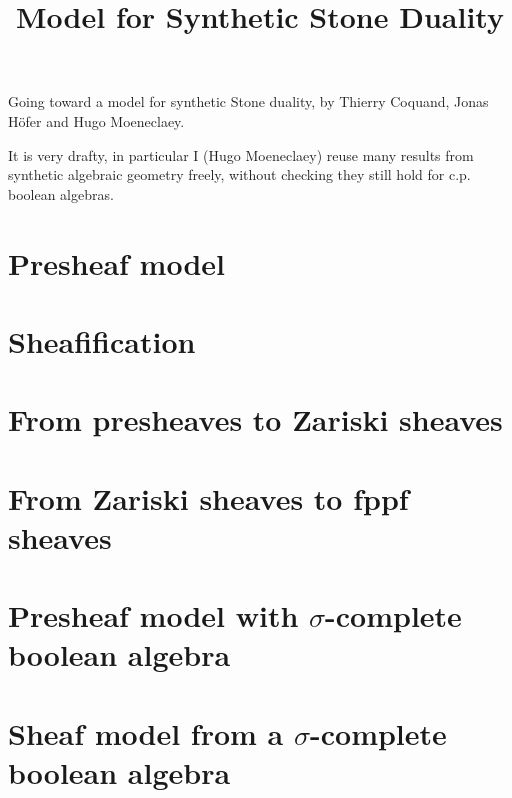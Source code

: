 \documentclass{../util/zariski}
\title{Model for Synthetic Stone Duality}
\begin{document}
\maketitle

Going toward a model for synthetic Stone duality, by Thierry Coquand, Jonas Höfer and Hugo Moeneclaey.

It is very drafty, in particular I (Hugo Moeneclaey) reuse many results from synthetic algebraic geometry freely, without checking they still hold for c.p. boolean algebras.

\tableofcontents

\section{Presheaf model}


\section{Sheafification}


\section{From presheaves to Zariski sheaves}


\section{From Zariski sheaves to fppf sheaves}


\section{Presheaf model with $\sigma$-complete boolean algebra}


\section{Sheaf model from a $\sigma$-complete boolean algebra}




\printindex

\printbibliography
\end{document}
